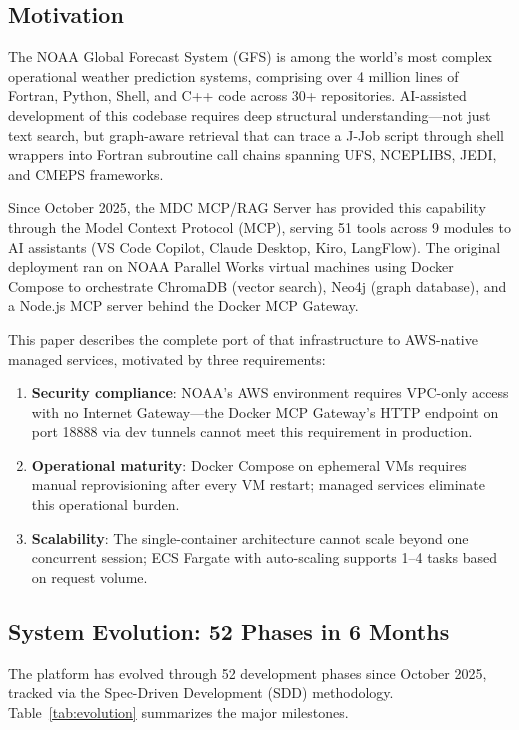 \documentclass[11pt,letterpaper]{article}
\begin{document}
\subsection{Motivation}

The NOAA Global Forecast System (GFS) is among the world's most complex
operational weather prediction systems, comprising over 4 million lines of
Fortran, Python, Shell, and C++ code across 30+ repositories. AI-assisted
development of this codebase requires deep structural understanding---not
just text search, but graph-aware retrieval that can trace a J-Job script
through shell wrappers into Fortran subroutine call chains spanning UFS,
NCEPLIBS, JEDI, and CMEPS frameworks.

Since October 2025, the MDC MCP/RAG Server has provided this capability
through the Model Context Protocol (MCP), serving 51 tools across 9 modules
to AI assistants (VS Code Copilot, Claude Desktop, Kiro, LangFlow). The
original deployment ran on NOAA Parallel Works virtual machines using Docker
Compose to orchestrate ChromaDB (vector search), Neo4j (graph database),
and a Node.js MCP server behind the Docker MCP Gateway.

This paper describes the complete port of that infrastructure to AWS-native
managed services, motivated by three requirements:

\begin{enumerate}[noitemsep]
    \item \textbf{Security compliance}: NOAA's AWS environment requires
          VPC-only access with no Internet Gateway---the Docker MCP Gateway's
          HTTP endpoint on port 18888 via dev tunnels cannot meet this
          requirement in production.
    \item \textbf{Operational maturity}: Docker Compose on ephemeral VMs
          requires manual reprovisioning after every VM restart; managed
          services eliminate this operational burden.
    \item \textbf{Scalability}: The single-container architecture cannot
          scale beyond one concurrent session; ECS Fargate with auto-scaling
          supports 1--4 tasks based on request volume.
\end{enumerate}

\subsection{System Evolution: 52 Phases in 6 Months}

The platform has evolved through 52 development phases since October 2025,
tracked via the Spec-Driven Development (SDD) methodology. Table~\ref{tab:evolution}
summarizes the major milestones.
\end{document}
